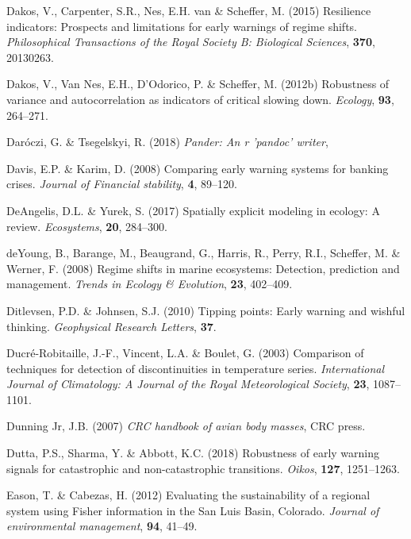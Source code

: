 \documentclass[12pt,twoside,openany]{reedthesis}
\begin{document}
\leavevmode\hypertarget{ref-dakos2015resilience}{}%
Dakos, V., Carpenter, S.R., Nes, E.H. van \& Scheffer, M. (2015) Resilience indicators: Prospects and limitations for early warnings of regime shifts. \emph{Philosophical Transactions of the Royal Society B: Biological Sciences}, \textbf{370}, 20130263.

\leavevmode\hypertarget{ref-dakos2012robustness}{}%
Dakos, V., Van Nes, E.H., D'Odorico, P. \& Scheffer, M. (2012b) Robustness of variance and autocorrelation as indicators of critical slowing down. \emph{Ecology}, \textbf{93}, 264--271.

\leavevmode\hypertarget{ref-pander}{}%
Daróczi, G. \& Tsegelskyi, R. (2018) \emph{Pander: An r 'pandoc' writer},

\leavevmode\hypertarget{ref-davis_comparing_2008}{}%
Davis, E.P. \& Karim, D. (2008) Comparing early warning systems for banking crises. \emph{Journal of Financial stability}, \textbf{4}, 89--120.

\leavevmode\hypertarget{ref-deangelis2017spatially}{}%
DeAngelis, D.L. \& Yurek, S. (2017) Spatially explicit modeling in ecology: A review. \emph{Ecosystems}, \textbf{20}, 284--300.

\leavevmode\hypertarget{ref-deyoung_regime_2008}{}%
deYoung, B., Barange, M., Beaugrand, G., Harris, R., Perry, R.I., Scheffer, M. \& Werner, F. (2008) Regime shifts in marine ecosystems: Detection, prediction and management. \emph{Trends in Ecology \& Evolution}, \textbf{23}, 402--409.

\leavevmode\hypertarget{ref-ditlevsen2010tipping}{}%
Ditlevsen, P.D. \& Johnsen, S.J. (2010) Tipping points: Early warning and wishful thinking. \emph{Geophysical Research Letters}, \textbf{37}.

\leavevmode\hypertarget{ref-ducre2003comparison}{}%
Ducré-Robitaille, J.-F., Vincent, L.A. \& Boulet, G. (2003) Comparison of techniques for detection of discontinuities in temperature series. \emph{International Journal of Climatology: A Journal of the Royal Meteorological Society}, \textbf{23}, 1087--1101.

\leavevmode\hypertarget{ref-dunning2007crc}{}%
Dunning Jr, J.B. (2007) \emph{CRC handbook of avian body masses}, CRC press.

\leavevmode\hypertarget{ref-dutta2018robustness}{}%
Dutta, P.S., Sharma, Y. \& Abbott, K.C. (2018) Robustness of early warning signals for catastrophic and non-catastrophic transitions. \emph{Oikos}, \textbf{127}, 1251--1263.

\leavevmode\hypertarget{ref-eason_evaluating_2012}{}%
Eason, T. \& Cabezas, H. (2012) Evaluating the sustainability of a regional system using Fisher information in the San Luis Basin, Colorado. \emph{Journal of environmental management}, \textbf{94}, 41--49.
\end{document}
